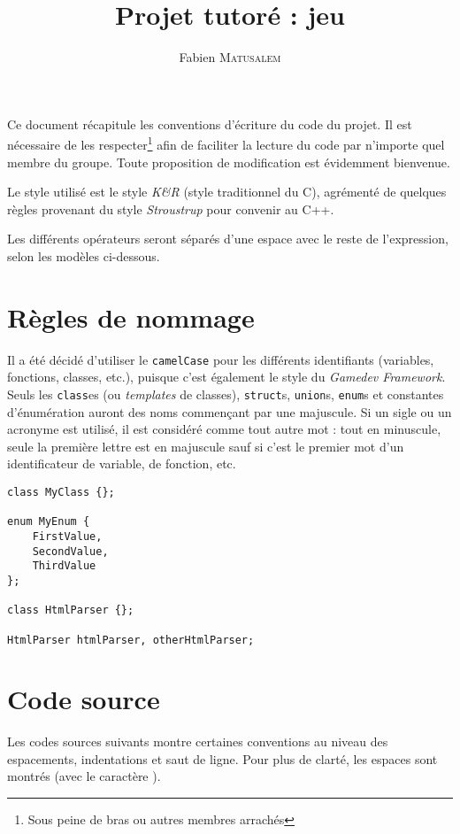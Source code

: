 \documentclass[12pt,a4paper]{article}
\author{Fabien \textsc{Matusalem}}
\title{Projet tutoré : jeu \flenglish{tactical} \\ \flenglish{Coding Standard}}
\date{}
\newcommand{\flenglish}[1]{\emph{\foreignlanguage{english}{#1}}}
\begin{document}
\maketitle

Ce document récapitule les conventions d'écriture du code du projet. Il est nécessaire de les respecter\footnote{Sous peine de bras ou autres membres arrachés} afin de faciliter la lecture du code par n'importe quel membre du groupe. Toute proposition de modification est évidemment bienvenue.

Le style utilisé est le style \emph{K\&R} (style traditionnel du C), agrémenté de quelques règles provenant du style \emph{Stroustrup} pour convenir au C++.

Les différents opérateurs seront séparés d'une espace avec le reste de l'expression, selon les modèles ci-dessous.

\section{Règles de nommage}
Il a été décidé d'utiliser le \texttt{camelCase} pour les différents identifiants (variables, fonctions, classes, etc.), puisque c'est également le style du \flenglish{Gamedev Framework}.
Seuls les \lstinline|class|es (ou \flenglish{templates} de classes), \lstinline|struct|s, \lstinline|union|s, \lstinline|enum|s et constantes d'énumération auront des noms commençant par une majuscule.
Si un sigle ou un acronyme est utilisé, il est considéré comme tout autre mot : tout en minuscule, seule la première lettre est en majuscule sauf si c'est le premier mot d'un identificateur de variable, de fonction, etc.

\begin{lstlisting}
class MyClass {};

enum MyEnum {
	FirstValue,
	SecondValue,
	ThirdValue
};

class HtmlParser {};

HtmlParser htmlParser, otherHtmlParser;
\end{lstlisting}

\section{Code source}

Les codes sources suivants montre certaines conventions au niveau des espacements, indentations et saut de ligne. Pour plus de clarté, les espaces sont montrés (avec le caractère \og\textvisiblespace\fg).
\end{document}

